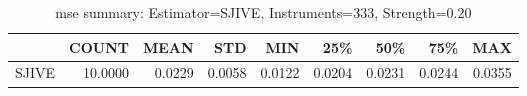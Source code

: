 \begin{table}[ht]
\centering
\caption{mse summary: Estimator=SJIVE, Instruments=333, Strength=0.20}
\begin{tabular}{lrrrrrrrr}
\toprule
 & COUNT & MEAN & STD & MIN & 25\% & 50\% & 75\% & MAX \\
\midrule
SJIVE & 10.0000 & 0.0229 & 0.0058 & 0.0122 & 0.0204 & 0.0231 & 0.0244 & 0.0355 \\
\bottomrule
\end{tabular}
\end{table}
